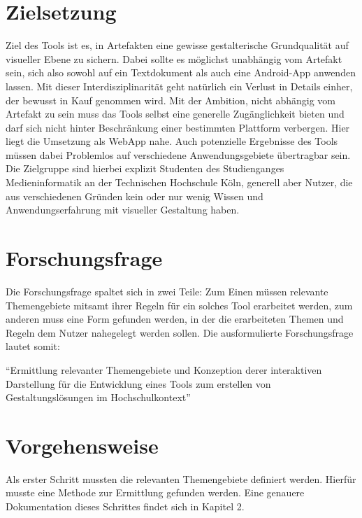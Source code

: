 \section{Zielsetzung}
Ziel des Tools ist es, in Artefakten eine gewisse gestalterische Grundqualität auf visueller Ebene zu sichern. Dabei sollte es möglichst unabhängig vom Artefakt sein, sich also sowohl auf ein Textdokument als auch eine Android-App anwenden lassen. Mit dieser Interdisziplinarität geht natürlich ein Verlust in Details einher, der bewusst in Kauf genommen wird.
Mit der Ambition, nicht abhängig vom Artefakt zu sein muss das Tools selbst eine generelle Zugänglichkeit bieten und darf sich nicht hinter Beschränkung einer bestimmten Plattform verbergen. Hier liegt die Umsetzung als WebApp nahe. Auch potenzielle Ergebnisse des Tools müssen dabei Problemlos auf verschiedene Anwendungsgebiete übertragbar sein.
Die Zielgruppe sind hierbei explizit Studenten des Studienganges Medieninformatik an der Technischen Hochschule Köln, generell aber Nutzer, die aus verschiedenen Gründen kein oder nur wenig Wissen und Anwendungserfahrung mit visueller Gestaltung haben.


\section{Forschungsfrage}
Die Forschungsfrage spaltet sich in zwei Teile: Zum Einen müssen relevante Themengebiete mitsamt ihrer Regeln für ein solches Tool erarbeitet werden, zum anderen muss eine Form gefunden werden, in der die erarbeiteten Themen und Regeln dem Nutzer nahegelegt werden sollen.
Die ausformulierte Forschungsfrage lautet somit:

“Ermittlung relevanter Themengebiete und Konzeption derer interaktiven Darstellung für die Entwicklung eines Tools zum erstellen von Gestaltungslösungen im Hochschulkontext”




\section{Vorgehensweise}
Als erster Schritt mussten die relevanten Themengebiete definiert werden. Hierfür musste eine Methode zur Ermittlung gefunden werden. Eine genauere Dokumentation dieses Schrittes findet sich in Kapitel 2.

